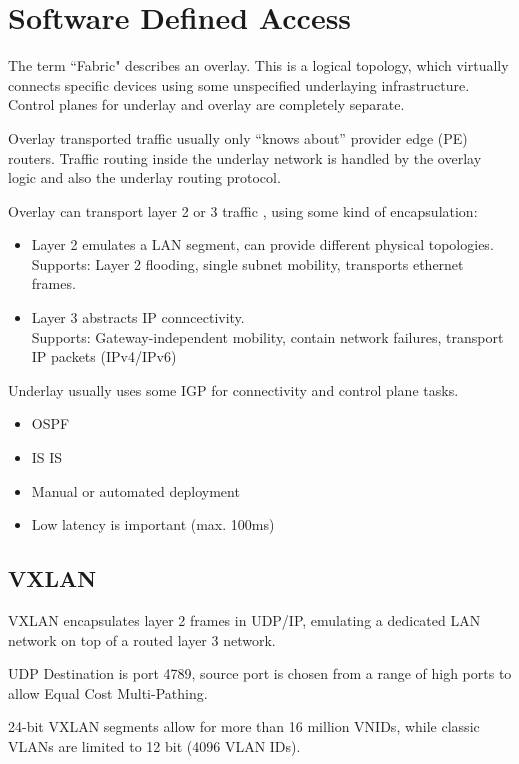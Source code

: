\section{Software Defined Access}

The term ``Fabric" describes an overlay. This is a logical topology, which virtually connects specific 
devices using some unspecified underlaying infrastructure.
Control planes for underlay and overlay are completely separate.

Overlay transported traffic usually only ``knows about'' provider edge (PE) routers. 
Traffic routing inside the underlay network is handled by the overlay logic and also the underlay routing protocol.

\vspace{3mm}
\noindent
Overlay can transport layer 2 or 3 traffic , using some kind of encapsulation:
\begin{itemize}
    \item Layer 2 emulates a LAN segment, can provide different physical topologies. \\
    Supports: Layer 2 flooding, single subnet mobility, transports ethernet frames.
    \item Layer 3 abstracts IP conncectivity. \\
    Supports: Gateway-independent mobility, contain network failures, transport IP packets (IPv4/IPv6)
\end{itemize}

\noindent
Underlay usually uses some IGP for connectivity and control plane tasks.
\begin{itemize}
    \item OSPF
    \item IS IS
    \item Manual or automated deployment
    \item Low latency is important (max. 100ms)
\end{itemize}

\subsection{VXLAN}

VXLAN encapsulates layer 2 frames in UDP/IP, emulating a dedicated LAN network on top of a routed layer 3 network.

UDP Destination is port 4789, source port is chosen from a range of high ports to allow Equal Cost Multi-Pathing.

24-bit VXLAN segments allow for more than 16 million VNIDs, while classic VLANs are limited to 12 bit (4096 VLAN IDs).

